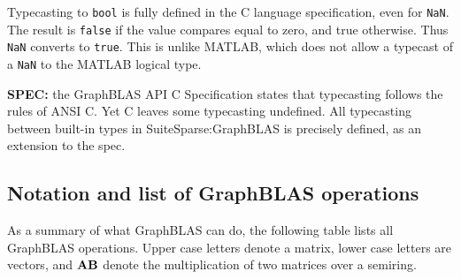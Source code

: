 \documentclass[12pt]{article}
\begin{document}
Typecasting to \verb'bool' is fully defined in the C language specification,
even for \verb'NaN'.  The result is \verb'false' if the value compares equal to
zero, and true otherwise.  Thus \verb'NaN' converts to \verb'true'.  This is
unlike MATLAB, which does not allow a typecast of a \verb'NaN' to the MATLAB
logical type.

\begin{alert}
{\bf SPEC:} the GraphBLAS API C Specification states that typecasting follows
the rules of ANSI C.  Yet C leaves some typecasting undefined.  All typecasting
between built-in types in SuiteSparse:GraphBLAS is precisely defined, as an
extension to the spec.
\end{alert}

\subsection{Notation and list of GraphBLAS operations} %
\label{list}

As a summary of what GraphBLAS can do, the following table lists all GraphBLAS
operations.  Upper case letters denote a matrix, lower case letters are
vectors, and ${\bf AB}$ denote the multiplication of two matrices over a
semiring.
\end{document}
